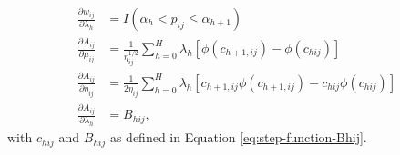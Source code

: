 \documentclass[
  american,
  man, donotrepeattitle,floatsintext]{apa7}
\begin{document}
\begin{align}
\frac{\partial w_{ij}}{\partial \lambda_h} &= I\left(\alpha_h < p_{ij} \leq \alpha_{h+1}\right) \\
\label{eq:step-function-dAdmu}
\frac{\partial A_{ij}}{\partial \mu_{ij}} &= \frac{1}{\eta_{ij}^{1/2}} \sum_{h=0}^H \lambda_h \left[\phi\left(c_{h+1,ij}\right) - \phi\left(c_{hij}\right)\right] \\
\label{eq:step-function-dAdeta}
\frac{\partial A_{ij}}{\partial \eta_{ij}} &= \frac{1}{2\eta_{ij}} \sum_{h=0}^H \lambda_h \left[c_{h+1,ij} \phi\left(c_{h+1,ij}\right) - c_{hij} \phi\left(c_{hij}\right)\right] \\
\label{eq:step-function-dAdlambda}
\frac{\partial A_{ij}}{\partial \lambda_h} &= B_{hij},
\end{align}
with \(c_{hij}\) and \(B_{hij}\) as defined in Equation \eqref{eq:step-function-Bhij}.
\end{document}
